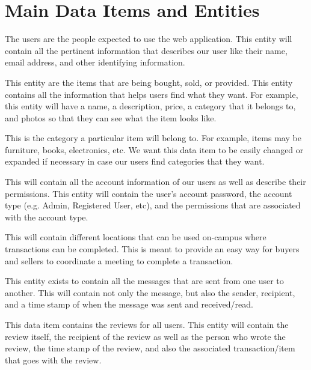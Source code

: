 \section{Main Data Items and Entities}

\begin{description}[font=\bfseries\itshape]

\item[user:] The users are the people expected to use the web application. This entity will contain all the pertinent information that describes our user like their name, email address, and other identifying information.
	
\item[item:] This entity are the items that are being bought, sold, or provided.  This entity contains all the information that helps users find what they want.  For example, this entity will have a name, a description, price, a category that it belongs to, and photos so that they can see what the item looks like.
	
\item[category:] This is the category a particular item will belong to.  For example, items may be furniture, books, electronics, etc.  We want this data item to be easily changed or expanded if necessary in case our users find categories that they want.

\item[account:] This will contain all the account information of our users as well as describe their permissions.  This entity will contain the user's account password, the account type (e.g. Admin, Registered User, etc), and the permissions that are associated with the account type.

\item[location:] This will contain different locations that can be used on-campus where transactions can be completed.  This is meant to provide an easy way for buyers and sellers to coordinate a meeting to complete a transaction.
	
\item[message:] This entity exists to contain all the messages that are sent from one user to another.  This will contain not only the message, but also the sender, recipient, and a time stamp of when the message was sent and received/read.
	
\item[review:] This data item contains the reviews for all users.  This entity will contain the review itself, the recipient of the review as well as the person who wrote the review, the time stamp of the review, and also the associated transaction/item that goes with the review.

\end{description}